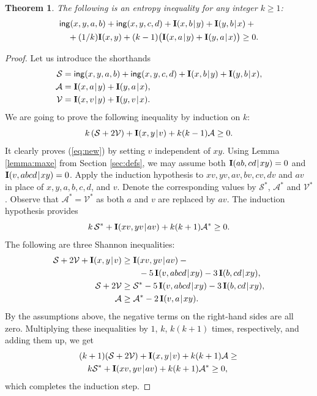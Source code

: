 \documentclass[a4paper]{IEEEtran}
\def\|{\mskip1.5mu{|}\mskip1.5mu}
\def\I{\mathbf I}
\def\ing[#1,#2,#3,#4]{\mathsf{ing}(#1,#2,#3,#4\mkern 0mu)}
\newtheorem{theorem}{Theorem}
\theoremstyle{definition}
\begin{document}
\begin{theorem}\label{thm:neweq}
The following is an entropy inequality for any integer $k\ge 1$:
\begin{align}\label{eq:new}
  &\ing[x,y,a,b]+\ing[x,y,c,d]+\I(x,b\|y)+\I(y,b\|x) +{} \\
  & ~~~ + (1/k)\I(x,y)+(k-1)\big(\I(x,a\|y)+\I(y,a\|x)\big) \ge 0.
  \nonumber
\end{align}
\end{theorem}
\begin{proof}
Let us introduce the shorthands
\begin{align*}
  \mathcal S &= \ing[x,y,a,b]+\ing[x,y,c,d]+\I(x,b\|y)+\I(y,b\|x), \\
  \mathcal A &= \I(x,a\|y)+\I(y,a\|x), \\
  \mathcal V &= \I(x,v\|y)+\I(y,v\|x).
\end{align*}
We are going to prove the following inequality by induction on $k$:
$$
  k\,(\mathcal S + 2\mathcal V) + \I(x,y\|v)+ k(k-1)\mathcal A  \ge 0.
$$
It clearly proves (\ref{eq:new}) by setting $v$ independent of $xy$.
Using Lemma \ref{lemma:maxe} from Section \ref{sec:defs},
we may assume both $\I(ab,cd\|xy)=0$ and $\I(v,abcd\|xy)=0$. Apply the induction
hypothesis to $xv,yv,av,bv,cv,dv$  and $av$ in place of $x,y,\allowbreak
a,b,\allowbreak c,d$, and $v$.
Denote the corresponding values by $\mathcal S^*$, $\mathcal A^*$ and $\mathcal V^*$.
Observe that $\mathcal A^*=\mathcal V^*$ as both $a$ and $v$ are replaced by
$av$. The induction hypothesis provides
$$
    k\,\mathcal S^*+\I(xv,yv\|av) + k(k+1)\mathcal A^* \ge 0.
$$
The following are three Shannon inequalities:
\begin{align*}
   \mathcal S+2\mathcal V+\I(x,y\|v) & \ge \I(xv,yv\|av) -{} \\
       & ~~~~~~-5\,\I(v,abcd\|xy)-3\,\I(b,cd\|xy), \\
   \mathcal S+2\mathcal V  & \ge \mathcal S^*
      -5\,\I(v,abcd\|xy)-3\,\I(b,cd\|xy),  \\
   \mathcal A &\ge \mathcal A^* - 2\,\I(v,a\|xy).
\end{align*}
By the assumptions above, the negative terms on the right-hand sides are all zero.
Multiplying these inequalities by $1$, $k$, $k(k+1)$ times, respectively, and
adding them up, we get
\begin{align*}
  & (k+1)(\mathcal S+2\mathcal V)+\I(x,y\|v)+k(k+1)\mathcal A \ge {} \\
  & ~~~ k\mathcal S^*+\I(xv,yv\|av)+k(k+1)\mathcal A^* \ge 0,
\end{align*}
which completes the induction step.
\end{proof}
\end{document}
